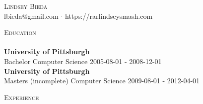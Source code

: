 \documentclass[a4paper]{article}
\newcommand{\lineunder} {
    \vspace*{-8pt} \\
    \hspace*{-18pt} \hrulefill \\
}
\newcommand{\header} [1] {
    {\hspace*{-18pt}\vspace*{6pt} \textsc{#1}}
    \vspace*{-6pt} \lineunder
}
\begin{document}
\vspace*{-40pt}

    

\vspace*{-10pt}
\begin{center}
	{\Huge \scshape {Lindsey Bieda}}\\
	lbieda@gmail.com $\cdot$ https://rarlindseysmash.com\\
\end{center}

\header{Education}
\textbf{University of Pittsburgh}\\
Bachelor Computer Science \hfill 2005-08-01 - 2008-12-01\\
\vspace{2mm}
\textbf{University of Pittsburgh}\\
Masters (incomplete) Computer Science \hfill 2009-08-01 - 2012-04-01\\
\vspace{2mm}

\header{Experience}
\vspace{1mm}
\end{document}
